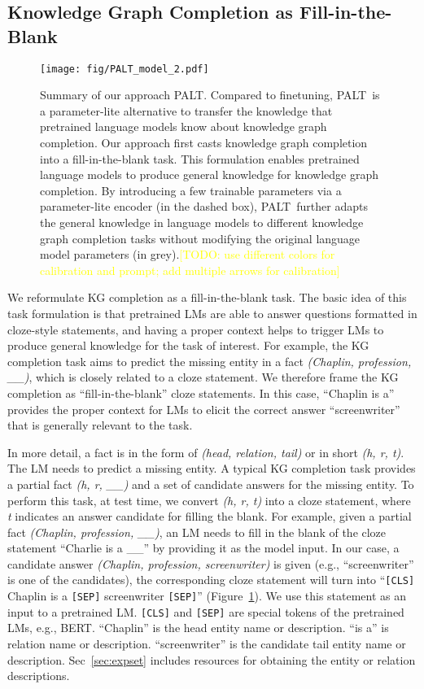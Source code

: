 \documentclass[11pt]{article}
\newcommand{\method}{\textsc{PALT}}
\newcommand{\texthrt}[1]{\textsl{#1}}
\newcommand{\textspt}[1]{\texttt{#1}}
\newcommand{\todo}[1]{\textcolor{yellow}{[TODO: #1]}}
\newcommand{\todo}[1]{}
\begin{document}
\subsection{Knowledge Graph Completion as Fill-in-the-Blank}
\label{sec:zs}

\begin{figure}[]
    \centering
    \texttt{[image: fig/PALT\_model\_2.pdf]}
    \caption{Summary of our approach \method. Compared to finetuning, \method\ is a parameter-lite alternative to transfer the knowledge that pretrained language models know about knowledge graph completion. Our approach first casts knowledge graph completion into a fill-in-the-blank task. This formulation enables pretrained language models to produce general knowledge for knowledge graph completion. By introducing a few trainable parameters via a parameter-lite encoder (in 
   the dashed box), \method\ further adapts the general knowledge in language models to different knowledge graph completion tasks without modifying the original language model parameters (in grey).\todo{use different colors for calibration and prompt;  add multiple arrows for calibration}}
    \label{fig:model}
\end{figure}

We reformulate KG completion as a fill-in-the-blank task. The basic idea of this task formulation is that pretrained LMs are able to answer questions formatted in cloze-style statements, and having a proper context helps to trigger LMs to produce general knowledge for the task of interest. For example, the KG completion task aims to predict the missing entity in a fact \texthrt{(Chaplin, profession, \_\_)}, which is closely related to a cloze statement. We therefore frame the KG completion as ``fill-in-the-blank'' cloze statements. In this case, ``Chaplin is a'' provides the proper context for LMs to elicit the correct answer ``screenwriter'' that is generally relevant to the task.

In more detail, a fact is in the form of \texthrt{(head, relation, tail)} or in short \texthrt{(h, r, t)}. The LM needs to predict a missing entity. A typical KG completion task provides a partial fact \texthrt{(h, r, \_\_)} and a set of candidate answers for the missing entity. To perform this task, at test time, we convert \texthrt{(h, r, t)} into a cloze statement, where \texthrt{t} indicates an answer candidate for filling the blank. For example, given a partial fact \texthrt{(Chaplin, profession, \_\_)}, an LM needs to fill in the blank of the cloze statement ``Charlie is a \_\_'' by providing it as the model input. In our case, a candidate answer \texthrt{(Chaplin, profession, screenwriter)} is given (e.g., ``screenwriter'' is one of the candidates), the corresponding cloze statement will turn into ``\textspt{[CLS]} Chaplin is a \textspt{[SEP]} screenwriter \textspt{[SEP]}'' (Figure~\ref{fig:model}). We use this statement as an input to a pretrained LM. \textspt{[CLS]} and \textspt{[SEP]} are special tokens of the pretrained LMs, e.g., BERT.  ``Chaplin'' is the head entity name or description. ``is a'' is relation name or description. ``screenwriter'' is the candidate tail entity name or description. Sec~\ref{sec:expset} includes resources for obtaining the entity or relation descriptions. 
\end{document}
